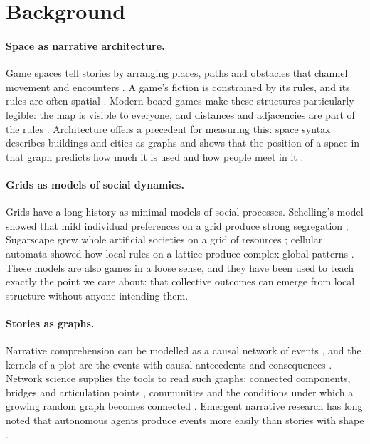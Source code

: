 \documentclass[11pt]{article}
\begin{document}
\section{Background}

\paragraph{Space as narrative architecture.} Game spaces tell stories by
arranging places, paths and obstacles that channel movement and encounters
\parencite{jenkins2004}. A game's fiction is constrained by its rules, and
its rules are often spatial \parencite{juul2005,salen2004}. Modern board
games make these structures particularly legible: the map is visible to
everyone, and distances and adjacencies are part of the rules
\parencite{woods2012}. Architecture offers a precedent for measuring this:
space syntax describes buildings and cities as graphs and shows that the
position of a space in that graph predicts how much it is used and how
people meet in it \parencite{hillier1984}.

\paragraph{Grids as models of social dynamics.} Grids have a long history as
minimal models of social processes. Schelling's model showed that mild
individual preferences on a grid produce strong segregation
\parencite{schelling1971}; Sugarscape grew whole artificial societies on a
grid of resources \parencite{epstein1996}; cellular automata showed how local
rules on a lattice produce complex global patterns \parencite{wolfram1984}.
These models are also games in a loose sense, and they have been used to
teach exactly the point we care about: that collective outcomes can emerge
from local structure without anyone intending them.

\paragraph{Stories as graphs.} Narrative comprehension can be modelled as a
causal network of events \parencite{trabasso1985}, and the kernels of a plot
are the events with causal antecedents and consequences
\parencite{barthes1975,chatman1978}. Network science supplies the tools to
read such graphs: connected components, bridges and articulation points
\parencite{tarjan1972}, communities \parencite{blondel2008} and the
conditions under which a growing random graph becomes connected
\parencite{newman2018}. Emergent narrative research has long noted that
autonomous agents produce events more easily than stories with shape
\parencite{aylett1999,louchart2004,riedl2013}.
\end{document}
